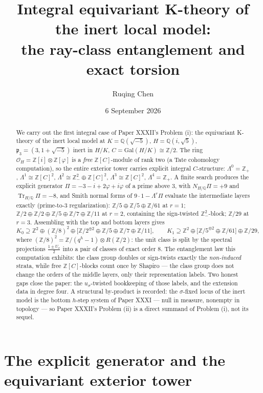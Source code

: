 \documentclass[11pt]{amsart}
\title[Integral equivariant K-theory of the inert model]{Integral equivariant K-theory of the inert local model:\\ the ray-class entanglement and exact torsion}
\author{Ruqing Chen}
\date{6 September 2026}
\theoremstyle{remark}
\newcommand{\Z}{\mathbb{Z}}
\newcommand{\Q}{\mathbb{Q}}
\newcommand{\OH}{\mathcal{O}_H}
\newcommand{\pp}{\mathfrak{p}}
\newcommand{\Ns}{N}
\newcommand{\Tr}{\operatorname{Tr}}
\begin{document}
\begin{abstract}
We carry out the first integral case of Paper XXXII's Problem (i): the equivariant
K-theory of the inert local model at $K=\Q(\sqrt{-5})$, $H=\Q(i,\sqrt5)$,
$\pp_3=(3,1+\sqrt{-5})$ inert in $H/K$, $C=\mathrm{Gal}(H/K)\cong\Z/2$. The ring
$\OH=\Z[i]\otimes\Z[\varphi]$ is a \emph{free} $\Z[C]$-module of rank two (a Tate
cohomology computation), so the entire exterior tower carries explicit integral
$C$-structure: $\Lambda^0=\Z_+$, $\Lambda^1\cong\Z[C]^2$,
$\Lambda^2\cong\Z_-^2\oplus\Z[C]^2$, $\Lambda^3\cong\Z[C]^2$, $\Lambda^4=\Z_+$. A finite
search produces the explicit generator $\Pi=-3-i+2\varphi+i\varphi$ of a prime above
$3$, with $\Ns_{H/\Q}\Pi=+9$ and $\Tr_{H/\Q}\Pi=-8$, and Smith normal forms of
$9\cdot1-\Lambda^r\Pi$ evaluate the intermediate layers exactly (prime-to-$3$
regularization): $\Z/5\oplus\Z/5\oplus\Z/61$ at $r=1$;
$\Z/2\oplus\Z/2\oplus\Z/5\oplus\Z/7\oplus\Z/11$ at $r=2$, containing the sign-twisted
$\Z_-^2$-block; $\Z/29$ at $r=3$. Assembling with the top and bottom layers gives
\[
K_0\supseteq\Z^2\oplus(\Z/8)^2\oplus\bigl[\Z/2^{\oplus2}\oplus\Z/5\oplus\Z/7\oplus\Z/11\bigr],
\qquad
K_1\supseteq\Z^2\oplus\bigl[\Z/5^{\oplus2}\oplus\Z/61\bigr]\oplus\Z/29,
\]
where $(\Z/8)^2=\Z/(q^h{-}1)\otimes R(\Z/2)$: the unit class is split by the spectral
projections $\tfrac{1\pm U_\sigma}2$ into a pair of classes of exact order $8$. The
entanglement law this computation exhibits: the class group doubles or sign-twists
exactly the \emph{non-induced} strata, while free $\Z[C]$-blocks count once by Shapiro
--- the class group does not change the orders of the middle layers, only their
representation labels. Two honest gaps close the paper: the $u_\sigma$-twisted
bookkeeping of those labels, and the extension data in degree four. A structural
by-product is recorded: the $\sigma$-fixed locus of the inert model is the bottom
$h$-step system of Paper XXXI --- null in measure, nonempty in topology --- so Paper
XXXII's Problem (ii) is a direct summand of Problem (i), not its sequel.
\end{abstract}

\maketitle

\section{The explicit generator and the equivariant exterior tower}\label{sec:tower}
\end{document}
